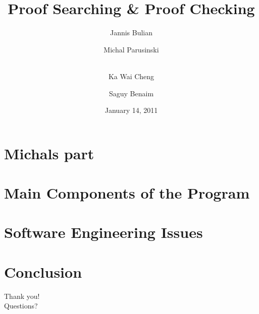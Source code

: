 \documentclass[usenames,dvipsnames]{beamer}
\title{Proof Searching \& Proof Checking}
\author[Jannis Bulian \and\\ Michal Parusinski \and\\ Ka Wai Cheng \and\\ Saguy Benaim]{Jannis Bulian \and Michal Parusinski \and \\ Ka Wai Cheng \and Saguy Benaim}
\date{January 14, 2011}
\institute{Imperial College London\\
           Department of Computing}
\begin{document}
\maketitle
\tableofcontents

\section{Michals part}

\section[Main Components]{Main Components of the Program}

\section{Software Engineering Issues}

\section{Conclusion}


\appendix

\begin{frame}
  \begin{center}
    {\Huge Thank you! \\}
    \vspace{1cm}
    {\Huge Questions?}
  \end{center}
\end{frame}

\begin{frame}
  
  
\end{frame}
\end{document}
